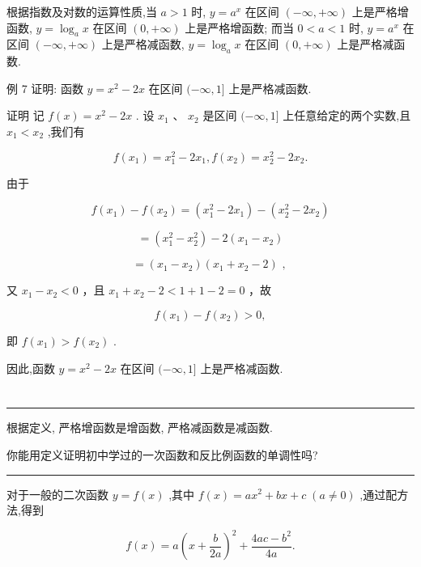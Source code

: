 \documentclass[10pt]{article}
\newcommand{\HRule}{\begin{center}\rule{0.9\linewidth}{0.2mm}\end{center}}
\begin{document}
根据指数及对数的运算性质,当 \(a > 1\) 时, \(y = {a}^{x}\) 在区间 \(\left( {-\infty , + \infty }\right)\) 上是严格增函数, \(y = {\log }_{a}x\) 在区间 \(\left( {0, + \infty }\right)\) 上是严格增函数; 而当 \(0 < a < 1\) 时, \(y = {a}^{x}\) 在区间 \(\left( {-\infty , + \infty }\right)\) 上是严格减函数, \(y = {\log }_{a}x\) 在区间 \(\left( {0, + \infty }\right)\) 上是严格减函数.

例 7 证明: 函数 \(y = {x}^{2} - {2x}\) 在区间 \(( - \infty ,1\rbrack\) 上是严格减函数.

证明 记 \(f\left( x\right)  = {x}^{2} - {2x}\) . 设 \({x}_{1}\text{ 、 }{x}_{2}\) 是区间 \(( - \infty ,1\rbrack\) 上任意给定的两个实数,且 \({x}_{1} < {x}_{2}\) ,我们有

\[
f\left( {x}_{1}\right)  = {x}_{1}^{2} - 2{x}_{1},f\left( {x}_{2}\right)  = {x}_{2}^{2} - 2{x}_{2}.
\]

由于

\[
f\left( {x}_{1}\right)  - f\left( {x}_{2}\right)  = \left( {{x}_{1}^{2} - 2{x}_{1}}\right)  - \left( {{x}_{2}^{2} - 2{x}_{2}}\right)
\]

\[
= \left( {{x}_{1}^{2} - {x}_{2}^{2}}\right)  - 2\left( {{x}_{1} - {x}_{2}}\right)
\]

\[
= \left( {{x}_{1} - {x}_{2}}\right) \left( {{x}_{1} + {x}_{2} - 2}\right) \text{ , }
\]

又 \({x}_{1} - {x}_{2} < 0\) ，且 \({x}_{1} + {x}_{2} - 2 < 1 + 1 - 2 = 0\) ，故

\[
f\left( {x}_{1}\right)  - f\left( {x}_{2}\right)  > 0,
\]

即 \(f\left( {x}_{1}\right)  > f\left( {x}_{2}\right)\) .

因此,函数 \(y = {x}^{2} - {2x}\) 在区间 \(( - \infty ,1\rbrack\) 上是严格减函数.

\section*{}

\HRule

根据定义, 严格增函数是增函数, 严格减函数是减函数.

你能用定义证明初中学过的一次函数和反比例函数的单调性吗?

\HRule

对于一般的二次函数 \(y = f\left( x\right)\) ,其中 \(f\left( x\right)  = a{x}^{2} + {bx} + c \; \left( {a \neq  0}\right)\) ,通过配方法,得到

\[
f\left( x\right)  = a{\left( x + \frac{b}{2a}\right) }^{2} + \frac{{4ac} - {b}^{2}}{4a}.
\]
\end{document}
